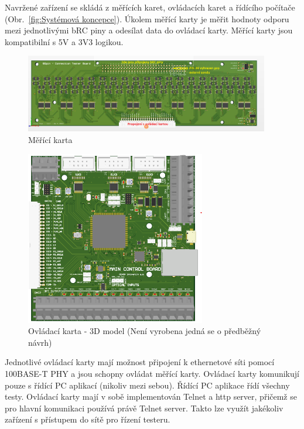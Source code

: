     Navržené zařízení se skládá z měřících karet, ovládacích karet a řídícího počítače
    \mbox{(Obr. \ref{fig:Systémová koncepce})}.
    Úkolem měřící karty je měřit hodnoty odporu mezi jednotlivými bRC piny
    a odesílat data do ovládací karty. Měřící karty jsou kompatibilní s 5V a 3V3 logikou.\\

    \begin{figure}[ht!] 
        \centering
        \includegraphics[width = 0.95\textwidth]{obrazky/karta_3D_NP.png}
        \caption{Měřící karta}
        \label{fig:Měřící karta}
    \end{figure}


    \begin{figure}[ht!]
        \centering
        \includegraphics[width = 0.7\textwidth]{obrazky/3D_ovl_karta.png}
        \caption{Ovládací karta - 3D model (Není vyrobena jedná se o předběžný návrh)}
        \label{fig:Ovládací karta - 3D model}
    \end{figure}

    Jednotlivé ovládací karty mají možnost připojení k ethernetové síti pomocí
    100BASE-T PHY a jsou schopny ovládat měřící karty.
    Ovládací karty komunikují pouze s řídící PC aplikací (nikoliv mezi sebou).
    Řídící PC aplikace řídí všechny testy. Ovládací karty mají v sobě implementován Telnet a http server,
    přičemž se pro hlavní komunikaci používá právě Telnet server.
    Takto lze využít jakékoliv zařízení s přístupem do sítě pro řízení testeru.\\
    
